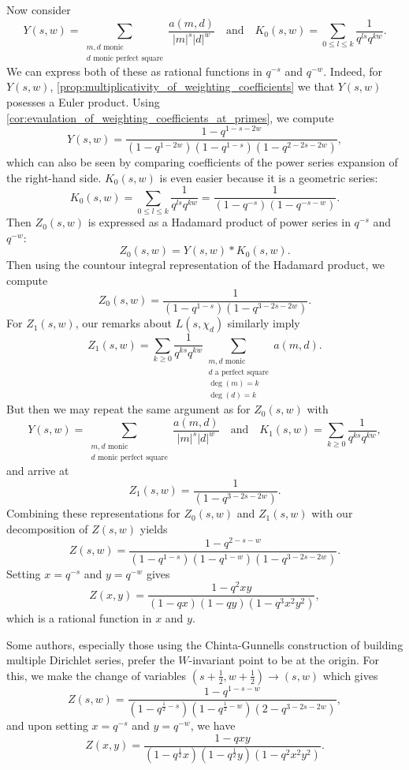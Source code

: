 \documentclass[12pt,reqno,oneside]{amsart}
\begin{document}
    Now consider
    \[
        Y(s,w) = \sum_{\substack{\text{$m,d$ monic} \\ \text{$d$ monic perfect square}}}\frac{a(m,d)}{|m|^{s}|d|^{w}} \quad \text{and} \quad K_{0}(s,w) = \sum_{0 \le l \le k}\frac{1}{q^{ls}q^{kw}}.
    \]
    We can express both of these as rational functions in $q^{-s}$ and $q^{-w}$. Indeed, for $Y(s,w)$, \cref{prop:multiplicativity_of_weighting_coefficients}  we that $Y(s,w)$ posesses a Euler product. Using \cref{cor:evaulation_of_weighting_coefficients_at_primes}, we compute
    \[
        Y(s,w) = \frac{1-q^{1-s-2w}}{(1-q^{1-2w})(1-q^{1-s})(1-q^{2-2s-2w})},
    \]
    which can also be seen by comparing coefficients of the power series expansion of the right-hand side. $K_{0}(s,w)$ is even easier because it is a geometric series:
    \[
        K_{0}(s,w) = \sum_{0 \le l \le k}\frac{1}{q^{ls}q^{kw}} = \frac{1}{(1-q^{-s})(1-q^{-s-w})}.
    \]
    Then $Z_{0}(s,w)$ is expressed as a Hadamard product of power series in $q^{-s}$ and $q^{-w}$:
    \[
        Z_{0}(s,w) = Y(s,w) \ast K_{0}(s,w).
    \]
    Then using the countour integral representation of the Hadamard product, we compute
    \[
        Z_{0}(s,w) = \frac{1}{(1-q^{1-s})(1-q^{3-2s-2w})}.
    \]
    For $Z_{1}(s,w)$, our remarks about $L(s,\chi_{d})$ similarly imply
    \[
        Z_{1}(s,w) = \sum_{k \ge 0}\frac{1}{q^{ks}q^{kw}}\sum_{\substack{\text{$m,d$ monic} \\ \text{$d$ a perfect square} \\ \deg(m) = k \\ \deg(d) = k}}a(m,d).
    \]
    But then we may repeat the same argument as for $Z_{0}(s,w)$ with
    \[
        Y(s,w) = \sum_{\substack{\text{$m,d$ monic} \\ \text{$d$ monic perfect square}}}\frac{a(m,d)}{|m|^{s}|d|^{w}} \quad \text{and} \quad K_{1}(s,w) = \sum_{k \ge 0}\frac{1}{q^{ks}q^{kw}},
    \]
    and arrive at
    \[
        Z_{1}(s,w) = \frac{1}{(1-q^{3-2s-2w})}.
    \]
    Combining these representations for $Z_{0}(s,w)$ and $Z_{1}(s,w)$ with our decomposition of $Z(s,w)$ yields
    \[
        Z(s,w) = \frac{1-q^{2-s-w}}{(1-q^{1-s})(1-q^{1-w})(1-q^{3-2s-2w})}.
    \]
    Setting $x = q^{-s}$ and $y = q^{-w}$ gives
    \[
        Z(x,y) = \frac{1-q^{2}xy}{(1-qx)(1-qy)(1-q^{3}x^{2}y^{2})},
    \]
    which is a rational function in $x$ and $y$.

    \begin{remark}
        Some authors, especially those using the Chinta-Gunnells construction of building multiple Dirichlet series, prefer the $W$-invariant point to be at the origin. For this, we make the change of variables $\left(s+\frac{1}{2},w+\frac{1}{2}\right) \to (s,w)$ which gives
        \[
            Z(s,w) = \frac{1-q^{1-s-w}}{(1-q^{\frac{1}{2}-s})(1-q^{\frac{1}{2}-w})(2-q^{3-2s-2w})},
        \]
         and upon setting $x = q^{-s}$ and $y = q^{-w}$, we have
        \[
            Z(x,y) = \frac{1-qxy}{(1-q^{\frac{1}{2}}x)(1-q^{\frac{1}{2}}y)(1-q^{2}x^{2}y^{2})}.
        \]
    \end{remark}
\end{document}

